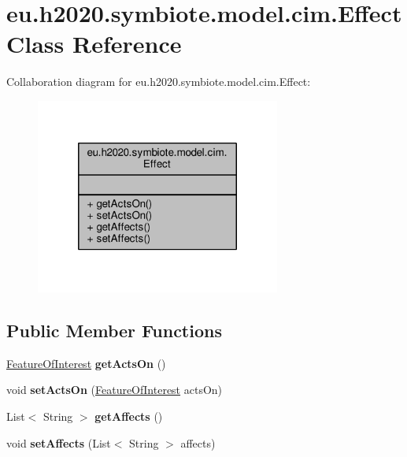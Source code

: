 \hypertarget{classeu_1_1h2020_1_1symbiote_1_1model_1_1cim_1_1Effect}{}\section{eu.\+h2020.\+symbiote.\+model.\+cim.\+Effect Class Reference}
\label{classeu_1_1h2020_1_1symbiote_1_1model_1_1cim_1_1Effect}


Collaboration diagram for eu.\+h2020.\+symbiote.\+model.\+cim.\+Effect\+:\nopagebreak
\begin{figure}[H]
\begin{center}
\leavevmode
\includegraphics[width=228pt]{classeu_1_1h2020_1_1symbiote_1_1model_1_1cim_1_1Effect__coll__graph}
\end{center}
\end{figure}
\subsection*{Public Member Functions}
\begin{DoxyCompactItemize}
\item 
\mbox{\label{classeu_1_1h2020_1_1symbiote_1_1model_1_1cim_1_1Effect_a75e18dec0830f2147960b4aa51973912}} 
\hyperlink{classeu_1_1h2020_1_1symbiote_1_1model_1_1cim_1_1FeatureOfInterest}{Feature\+Of\+Interest} {\bfseries get\+Acts\+On} ()
\item 
\mbox{\label{classeu_1_1h2020_1_1symbiote_1_1model_1_1cim_1_1Effect_a4571e757811a7f6e69355b594c54c1cd}} 
void {\bfseries set\+Acts\+On} (\hyperlink{classeu_1_1h2020_1_1symbiote_1_1model_1_1cim_1_1FeatureOfInterest}{Feature\+Of\+Interest} acts\+On)
\item 
\mbox{\label{classeu_1_1h2020_1_1symbiote_1_1model_1_1cim_1_1Effect_a91d7c9bfe24273bfa4416a9d1a476342}} 
List$<$ String $>$ {\bfseries get\+Affects} ()
\item 
\mbox{\label{classeu_1_1h2020_1_1symbiote_1_1model_1_1cim_1_1Effect_a62f75cb7d51647a5b03a8b765e8bd47c}} 
void {\bfseries set\+Affects} (List$<$ String $>$ affects)
\end{DoxyCompactItemize}


